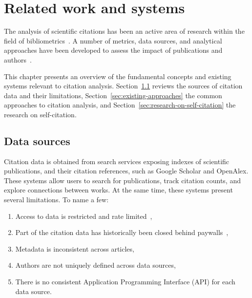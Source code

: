 
\chapter{Related work and systems} \label{c2:related-work}

The analysis of scientific citations has been an active area of research within the field of bibliometrics~\cite{Glnzel2003BIBLIOMETRICSAA}.
A number of metrics, data sources, and analytical approaches have been developed to assess the impact of publications and authors~\cite{Hirsch2005, Boyack2005}.

This chapter presents an overview of the fundamental concepts and existing systems relevant to citation analysis.
Section~\ref{sec:data-sources} reviews the sources of citation data and their limitations, Section~\ref{sec:existing-approaches} the common approaches to citation analysis, and Section~\ref{sec:research-on-self-citation} the research on self-citation.

\section{Data sources} \label{sec:data-sources}

Citation data is obtained from search services exposing indexes of scientific publications, and their citation references, such as \textsf{Google Scholar} and \textsf{OpenAlex}.
These systems allow users to search for publications, track citation counts, and explore connections between works.
At the same time, these systems present several limitations. 
To name a few: 
\begin{enumerate}
\item
Access to data is restricted and rate limited~\cite{Gusenbauer2020}, 
\item
Part of the citation data has historically been closed behind paywalls~\cite{Peroni2020}, 
\item
Metadata is inconsistent across articles, 
\item
Authors are not uniquely defined across data sources, 
\item
There is no consistent Application Programming Interface (API) for each data source.
\end{enumerate}

